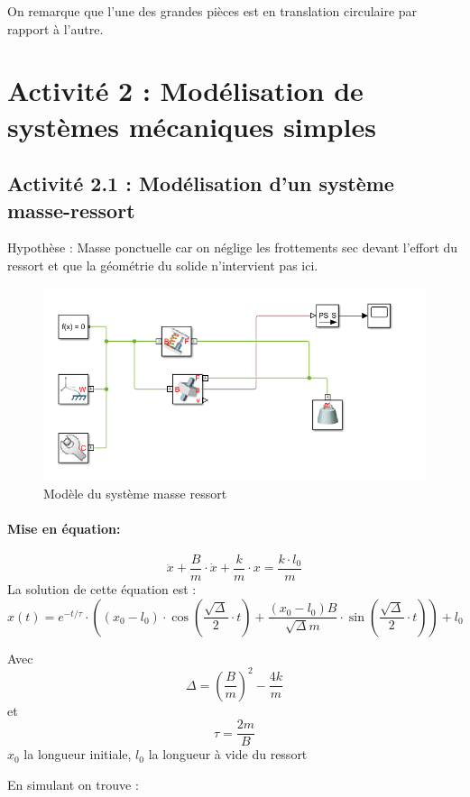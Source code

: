 \documentclass[12pt,a4paper]{article}
\begin{document}
On remarque que l'une des grandes pièces est en translation circulaire par rapport à l'autre.
\section{Activité 2 : Modélisation de systèmes mécaniques simples}
\subsection{Activité 2.1 : Modélisation d’un système masse-ressort}
Hypothèse : Masse ponctuelle car on néglige les frottements sec devant l'effort du ressort et que la géométrie du solide n'intervient pas ici.

\begin{figure}[h!]
\centering
\includegraphics[width=.9\linewidth]{masse.png}
\caption{Modèle du système masse ressort}
\end{figure}

\paragraph{Mise en équation:}

\[ \ddot{x}+\dfrac{B}{m} \cdot \dot{x} + \dfrac{k}{m} \cdot x = \dfrac{k \cdot l_{0}}{m} \]
La solution de cette équation est : 
\[ x(t) = e^{-t/\tau} \cdot \left((x_{0}-l_{0}) \cdot \cos(\dfrac{\sqrt{\Delta}}{2}\cdot t)+ \dfrac{(x_{0}-l_{0}) B}{\sqrt{\Delta} m} \cdot \sin(\dfrac{\sqrt{\Delta}}{2}\cdot t) \right) + l_{0} \]

Avec \[\Delta = (\dfrac{B}{m})^2 - \dfrac{4 k}{m}\] et \[\tau = \dfrac{2 m }{B}\]
$x_0$ la longueur initiale, $l_0$ la longueur à vide du ressort 

En simulant on trouve : 
\end{document}
